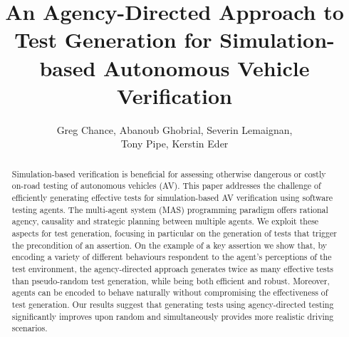 \documentclass[runningheads,a4paper]{llncs}
\begin{document}

\mainmatter


\title{An Agency-Directed Approach to Test Generation for Simulation-based Autonomous Vehicle Verification}




\author{Greg Chance, Abanoub Ghobrial, Severin Lemaignan, \\Tony Pipe, Kerstin Eder}

\maketitle

\makeatletter
\renewcommand\subsubsection{\@startsection{subsubsection}{3}{\z@}%
                       {-18\p@ \@plus -4\p@ \@minus -4\p@}%
                       {4\p@ \@plus 2\p@ \@minus 2\p@}%
                       {\normalfont\normalsize\bfseries\boldmath
                        \rightskip=\z@ \@plus 8em\pretolerance=10000 }}
\makeatother


\begin{abstract}
Simulation-based verification is beneficial for assessing otherwise dangerous or costly on-road testing of autonomous vehicles (AV). This paper addresses the challenge of efficiently generating effective tests for simulation-based AV verification using software testing agents. The multi-agent system (MAS) programming paradigm offers rational agency, causality and strategic planning between multiple agents. We exploit these aspects for test generation, focusing in particular on the generation of tests that trigger the precondition of an assertion. On the example of a key assertion we show that, by encoding a variety of different behaviours respondent to the agent's perceptions of the test environment, the agency-directed approach generates twice as many effective tests than pseudo-random test generation, while being both efficient and robust. Moreover, agents can be encoded to behave naturally without compromising the effectiveness of test generation. Our results suggest that generating tests using agency-directed testing significantly improves upon random and simultaneously provides more realistic driving scenarios.
\end{abstract}
\end{document}
